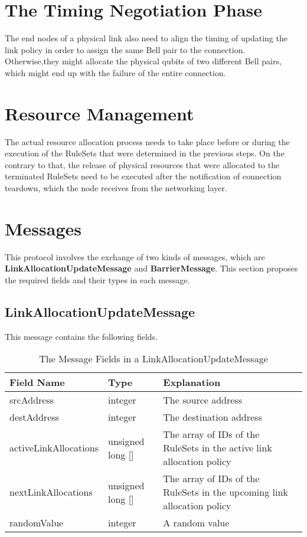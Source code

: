 \section{The Timing Negotiation Phase}

The end nodes of a physical link also need to align the timing of updating the link policy in order to assign the same Bell pair to the connection.
Otherwise,they might allocate the physical qubits of two different Bell pairs, which might end up with the failure of the entire connection.

\section{Resource Management}

The actual resource allocation process needs to take place before or during the execution of the RuleSets that were determined in the previous steps.
On the contrary to that, the release of physical resources that were allocated to the terminated RuleSets need to be executed after the notification of connection teardown, which the node receives from the networking layer.

\section{Messages}

This protocol involves the exchange of two kinds of messages, which are \textbf{LinkAllocationUpdateMessage} and \textbf{BarrierMessage}.
This section proposes the required fields and their types in each message.

\subsection{LinkAllocationUpdateMessage}
 
This message contains the following fields.

\begin{table}[ht]
  \begin{center}
    \begin{tabular}{|m{10em}|m{10em}|m{10em}|} \hline
      Field Name & Type & Explanation \\ \hline \cline{1-3}
      srcAddress & integer & The source address \\ \cline{1-3}
      destAddress & integer & The destination address \\ \cline{1-3}
      activeLinkAllocations & unsigned long [] & The array of IDs of the RuleSets in the active link allocation policy \\ \cline{1-3}
      nextLinkAllocations & unsigned long [] & The array of IDs of the RuleSets in the upcoming link allocation policy \\ \cline{1-3}
      randomValue & integer & A random value \\ \cline{1-3}
    \end{tabular}
    \caption{The Message Fields in a LinkAllocationUpdateMessage}
  \end{center}
\end{table}

